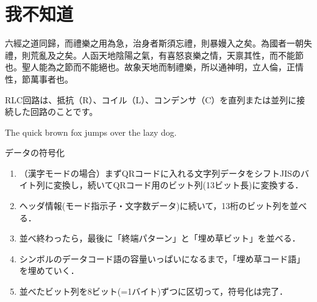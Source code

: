 \section{我不知道}

六經之道同歸，而禮樂之用為急，治身者斯須忘禮，則暴嫚入之矣。為國者一朝失禮，則荒亂及之矣。人函天地陰陽之氣，有喜怒哀樂之情，天禀其性，而不能節也。聖人能為之節而不能絕也。故象天地而制禮樂，所以通神明，立人倫，正情性，節萬事者也。

RLC回路は、抵抗（R）、コイル（L）、コンデンサ（C）を直列または並列に接続した回路のことです。

The quick brown fox jumps over the lazy dog.

データの符号化
\begin{enumerate}
	\item （漢字モードの場合）まずQRコードに入れる文字列データをシフトJISのバイト列に変換し，続いてQRコード用のビット列(13ビット長)に変換する．
	\item ヘッダ情報(モード指示子・文字数データ)に続いて，13桁のビット列を並べる．
	\item 並べ終わったら，最後に「終端パターン」と「埋め草ビット」を並べる．
	\item シンボルのデータコード語の容量いっぱいになるまで，「埋め草コード語」を埋めていく．
	\item 並べたビット列を8ビット(=1バイト)ずつに区切って，符号化は完了．
\end{enumerate}
